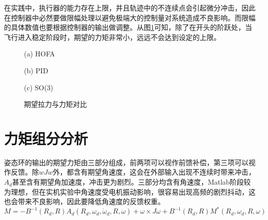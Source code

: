 在实践中，执行器的能力存在上限，并且轨迹中的不连续点会引起微分冲击，因此在控制器中必然要做限幅处理以避免极端大的控制量对系统造成不良影响。而限幅的具体数值也要根据控制器的输出做调整。从图\ref{matlab_fM}可知，除了在开头的阶跃处，当飞行进入稳定阶段时，期望的力矩非常小，远远不会达到设定的上限。
\begin{figure}[h]
  \centering
  \begin{minipage}[t]{0.33\textwidth}
    \centering
    \caption*{(a) HOFA}
  \end{minipage}\hfill
  \begin{minipage}[t]{0.33\textwidth}
    \centering
    \caption*{(b) PID}
  \end{minipage}\hfill
  \begin{minipage}[t]{0.33\textwidth}
    \centering
    \caption*{(c) SO(3)}
  \end{minipage}
  \caption{期望拉力与力矩对比}
  \label{matlab_fM}
\end{figure}


\section{力矩组分分析}
姿态环的输出的期望力矩由三部分组成，前两项可以视作前馈补偿，第三项可以视作反馈。除$wJw$外，都含有期望角速度，这会在外部输入出现不连续时带来冲击，$A_d$甚至含有期望角加速度，冲击更为剧烈。三部分均含有角速度，Matlab阶段较为理想，但在实机实验中角速度受电机振动影响，很容易出现高频的剧烈抖动，这也会带来不良影响，因此要降低角速度的反馈权重。
$$M=-B^{-1}(R_d,R) A_d(R_d,\omega_d,\dot \omega_d,R,\omega)+\omega \times J\omega +B^{-1}(R_d,R)M^*(R_d,\omega_d,R,\omega)$$

